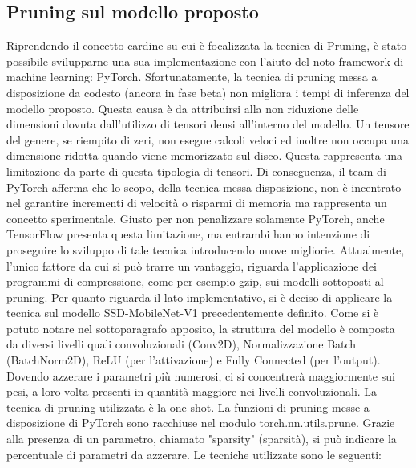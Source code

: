 \subsection{Pruning sul modello proposto}
Riprendendo il concetto cardine su cui è focalizzata la tecnica di Pruning, è stato possibile svilupparne una sua implementazione con l'aiuto del noto framework di machine learning: PyTorch. Sfortunatamente, la tecnica di pruning messa a disposizione da codesto (ancora in fase beta) non migliora i tempi di inferenza del modello proposto. Questa causa è da attribuirsi alla non riduzione delle dimensioni dovuta dall'utilizzo di tensori densi all'interno del modello. Un tensore del genere, se riempito di zeri, non esegue calcoli veloci ed inoltre non occupa una dimensione ridotta quando viene memorizzato sul disco. Questa rappresenta una limitazione da parte di questa tipologia di tensori. Di conseguenza, il team di PyTorch afferma che lo scopo, della tecnica messa disposizione, non è incentrato nel garantire incrementi di velocità o risparmi di memoria ma rappresenta un concetto sperimentale. Giusto per non penalizzare solamente PyTorch, anche TensorFlow presenta questa limitazione, ma entrambi hanno intenzione di proseguire lo sviluppo di tale tecnica introducendo nuove migliorie. Attualmente, l'unico fattore da cui si può trarre un vantaggio, riguarda l'applicazione dei programmi di compressione, come per esempio gzip, sui modelli sottoposti al pruning. 
Per quanto riguarda il lato implementativo, si è deciso di applicare la tecnica sul modello SSD-MobileNet-V1 precedentemente definito. Come si è potuto notare nel sottoparagrafo apposito, la struttura del modello è composta da diversi livelli quali convoluzionali (Conv2D), Normalizzazione Batch (BatchNorm2D), ReLU (per l'attivazione) e Fully Connected (per l'output). Dovendo azzerare i parametri più numerosi, ci si concentrerà maggiormente sui pesi, a loro volta presenti in quantità maggiore nei livelli convoluzionali. 
La tecnica di pruning utilizzata è la one-shot.
La funzioni di pruning messe a disposizione di PyTorch sono racchiuse nel modulo torch.nn.utils.prune. Grazie alla presenza di un parametro, chiamato "sparsity" (sparsità), si può indicare la percentuale di parametri da azzerare. Le tecniche utilizzate sono le seguenti:
